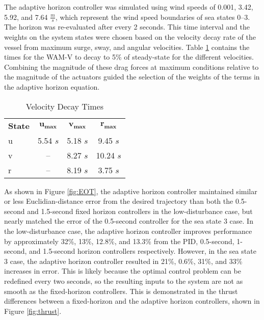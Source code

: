 \documentclass[letterpaper, 10 pt, conference]{ieeeconf}  %
\begin{document}
The adaptive horizon controller was simulated using wind speeds of 0.001, 3.42, 5.92, and 7.64 $\frac{m}{s}$, which represent the wind speed boundaries of sea states 0--3. The horizon was re-evaluated after every 2 seconds. This time interval and the weights on the system states were chosen based on the velocity decay rate of the vessel from maximum surge, sway, and angular velocities. Table \ref{tab:times} contains the times for the WAM-V to decay to 5\% of steady-state for the different velocities.
Combining the magnitude of these drag forces at maximum conditions relative to the magnitude of the actuators guided the selection of the weights of the terms in the adaptive horizon equation.
%
\begin{table}[tb]
\vspace{0.1in}
\caption{Velocity Decay Times}
\vspace{-0.1in}
\label{tab:times}
  \begin{center}
    \begin{tabular}{lccc}
    \textbf{State} & $\bm{u_{max}}$ & $\bm{v_{max}}$ & $\bm{r_{max}}$\\
    u & 5.54 $s$ & 5.18 $s$ & 9.45 $s$\\
    v & -- & 8.27 $s$ & 10.24 $s$\\
    r & -- & 8.19 $s$ & 3.75 $s$\\
    \end{tabular}
  \end{center}
\end{table}

As shown in Figure \ref{fig:EOT}, the adaptive horizon controller maintained similar or less Euclidian-distance error from the desired trajectory than both the 0.5-second and 1.5-second fixed horizon controllers in the low-disturbance case, but nearly matched the error of the 0.5-second controller for the sea state 3 case. In the low-disturbance case, the adaptive horizon controller improves performance by approximately 32\%, 13\%, 12.8\%, and 13.3\% from the PID, 0.5-second, 1-second, and 1.5-second horizon controllers respectively. However, in the sea state 3 case, the adaptive horizon controller resulted in 21\%, 0.6\%, 31\%, and 33\% increases in error. This is likely because the optimal control problem can be redefined every two seconds, so the resulting inputs to the system are not as smooth as the fixed-horizon controllers. This is demonstrated in the thrust differences between a fixed-horizon and the adaptive horizon controllers, shown in Figure \ref{fig:thrust}.
\end{document}
